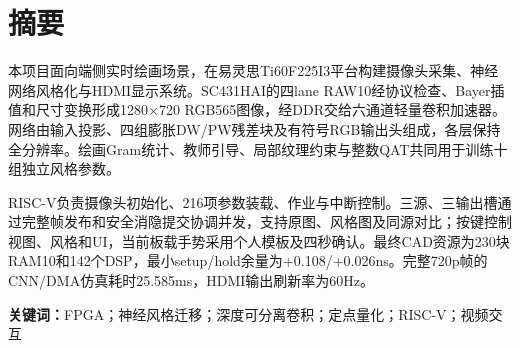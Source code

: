 \section*{摘要}
本项目面向端侧实时绘画场景，在易灵思Ti60F225I3平台构建摄像头采集、神经网络风格化与HDMI显示系统。SC431HAI的四lane RAW10经协议检查、Bayer插值和尺寸变换形成1280×720 RGB565图像，经DDR交给六通道轻量卷积加速器。网络由输入投影、四组膨胀DW/PW残差块及有符号RGB输出头组成，各层保持全分辨率。绘画Gram统计、教师引导、局部纹理约束与整数QAT共同用于训练十组独立风格参数。

RISC-V负责摄像头初始化、216项参数装载、作业与中断控制。三源、三输出槽通过完整帧发布和安全消隐提交协调并发，支持原图、风格图及同源对比；按键控制视图、风格和UI，当前板载手势采用个人模板及四秒确认。最终CAD资源为230块RAM10和142个DSP，最小setup/hold余量为+0.108/+0.026ns。完整720p帧的CNN/DMA仿真耗时25.585ms，HDMI输出刷新率为60Hz。

\noindent\textbf{关键词：}FPGA；神经风格迁移；深度可分离卷积；定点量化；RISC-V；视频交互
